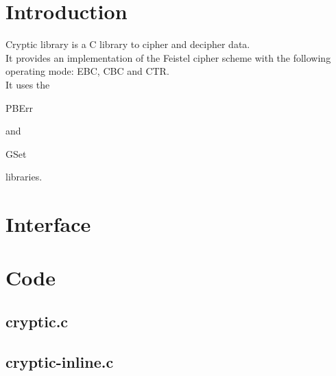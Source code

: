 \section*{Introduction}

Cryptic library is a C library to cipher and decipher data.\\

It provides an implementation of the Feistel cipher scheme with the following operating mode: EBC, CBC and CTR.\\

It uses the \begin{ttfamily}PBErr\end{ttfamily} and \begin{ttfamily}GSet\end{ttfamily} libraries.\\

\section{Interface}

\begin{scriptsize}
\begin{ttfamily}

\end{ttfamily}
\end{scriptsize}

\section{Code}

\subsection{cryptic.c}

\begin{scriptsize}
\begin{ttfamily}

\end{ttfamily}
\end{scriptsize}

\subsection{cryptic-inline.c}

\begin{scriptsize}
\begin{ttfamily}

\end{ttfamily}
\end{scriptsize}

